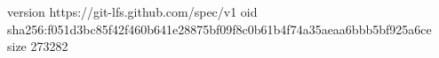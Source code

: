 version https://git-lfs.github.com/spec/v1
oid sha256:f051d3bc85f42f460b641e28875bf09f8c0b61b4f74a35aeaa6bbb5bf925a6ce
size 273282
